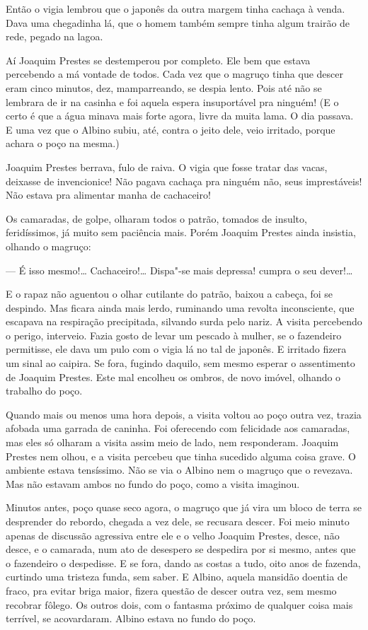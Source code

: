 \begin{linenumbers}
Então o vigia lembrou que o japonês da outra margem tinha cachaça à
venda. Dava uma chegadinha lá, que o homem também sempre tinha algum
trairão de rede, pegado na lagoa.

Aí Joaquim Prestes se destemperou por completo. Ele bem que estava
percebendo a má vontade de todos. Cada vez que o magruço tinha que
descer eram cinco minutos, dez, mamparreando, se despia lento. Pois até
não se lembrara de ir na casinha e foi aquela espera insuportável pra
ninguém! (E o certo é que a água minava mais forte agora, livre da muita
lama. O dia passava. E uma vez que o Albino subiu, até, contra o jeito
dele, veio irritado, porque achara o poço na mesma.)

Joaquim Prestes berrava, fulo de raiva. O vigia que fosse tratar das
vacas, deixasse de invencionice! Não pagava cachaça pra ninguém não,
seus imprestáveis! Não estava pra alimentar manha de cachaceiro!

Os camaradas, de golpe, olharam todos o patrão, tomados de insulto,
feridíssimos, já muito sem paciência mais. Porém Joaquim Prestes ainda
insistia, olhando o magruço:

--- É isso mesmo!\ldots{} Cachaceiro!\ldots{} Dispa"-se mais depressa! cumpra o seu
dever!\ldots{}

E o rapaz não aguentou o olhar cutilante do patrão, baixou a cabeça, foi
se despindo. Mas ficara ainda mais lerdo, ruminando uma revolta
inconsciente, que escapava na respiração precipitada, silvando surda
pelo nariz. A visita percebendo o perigo, interveio. Fazia gosto de
levar um pescado à mulher, se o fazendeiro permitisse, ele dava um pulo
com o vigia lá no tal de japonês. E irritado fizera um sinal ao caipira.
Se fora, fugindo daquilo, sem mesmo esperar o assentimento de Joaquim
Prestes. Este mal encolheu os ombros, de novo imóvel, olhando o trabalho
do poço.

Quando mais ou menos uma hora depois, a visita voltou ao poço outra vez,
trazia afobada uma garrada de caninha. Foi oferecendo com felicidade aos
camaradas, mas eles só olharam a visita assim meio de lado, nem
responderam. Joaquim Prestes nem olhou, e a visita percebeu que tinha
sucedido alguma coisa grave. O ambiente estava tensíssimo. Não se via o
Albino nem o magruço que o revezava. Mas não estavam ambos no fundo do
poço, como a visita imaginou.

Minutos antes, poço quase seco agora, o magruço que já vira um bloco de
terra se desprender do rebordo, chegada a vez dele, se recusara descer.
Foi meio minuto apenas de discussão agressiva entre ele e o velho
Joaquim Prestes, desce, não desce, e o camarada, num ato de desespero se
despedira por si mesmo, antes que o fazendeiro o despedisse. E se fora,
dando as costas a tudo, oito anos de fazenda, curtindo uma tristeza
funda, sem saber. E Albino, aquela mansidão doentia de fraco, pra evitar
briga maior, fizera questão de descer outra vez, sem mesmo recobrar
fôlego. Os outros dois, com o fantasma próximo de qualquer coisa mais
terrível, se acovardaram. Albino estava no fundo do poço.


\end{linenumbers}
